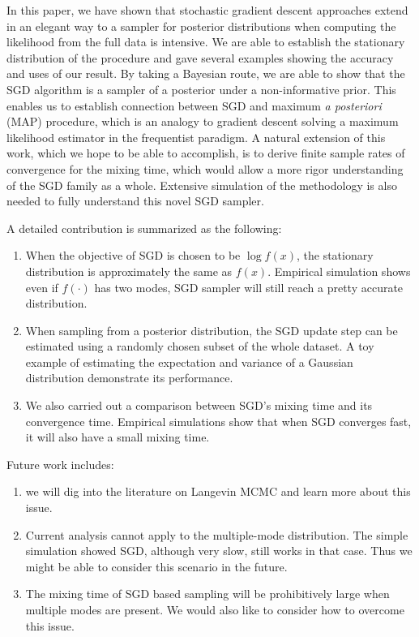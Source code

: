 \documentclass[preprint,12pt,3p]{elsarticle}
\begin{document}
In this paper, we have shown that stochastic gradient descent approaches extend in an elegant way to a sampler for posterior distributions when computing the likelihood from the full data is intensive. We are able to establish the stationary distribution of the procedure and gave several examples showing the accuracy and uses of our result. By taking a Bayesian route, we are able to show that the SGD algorithm is a sampler of a posterior under a non-informative prior. This enables us to establish connection between SGD and maximum \emph{a posteriori} (MAP) procedure, which is an analogy to gradient descent solving a maximum likelihood estimator in the frequentist paradigm. A natural extension of this work, which we hope to be able to accomplish, is to derive finite sample rates of convergence for the mixing time, which would allow a more rigor understanding of the SGD family as a whole. Extensive simulation of the methodology is also needed to fully understand this novel SGD sampler.

A detailed contribution is summarized as the following:
\begin{enumerate}
    \item When the objective of SGD is chosen to be $\log f(x)$, the stationary distribution is approximately the same as $f(x)$. Empirical simulation shows even if $f(\cdot)$ has two modes, SGD sampler will still reach a pretty accurate distribution.
    \item When sampling from a posterior distribution, the SGD update step can be estimated using a randomly chosen subset of the whole dataset. A toy example of estimating the expectation and variance of a Gaussian distribution demonstrate its performance.
    \item We also carried out a comparison between SGD's mixing time and its convergence time. Empirical simulations show that when SGD converges fast, it will also have a small mixing time.
\end{enumerate}
Future work includes:
\begin{enumerate}
    \item we will dig into the literature on Langevin MCMC and learn more about this issue. 
    \item Current analysis cannot apply to the multiple-mode distribution. The simple simulation showed SGD, although very slow, still works in that case. Thus we might be able to consider this scenario in the future.
    \item The mixing time of SGD based sampling will be prohibitively large when multiple modes are present. We would also like to consider how to overcome this issue.
\end{enumerate}
\end{document}
